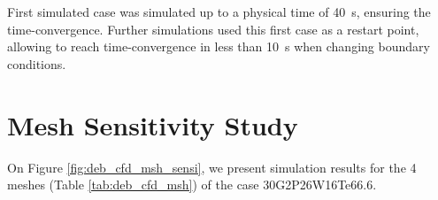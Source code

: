 \begin{note*}{}
First simulated case was simulated up to a physical time of 40\ s, ensuring the time-convergence. Further simulations used this first case as a restart point, allowing to reach time-convergence in less than 10\ s when changing boundary conditions.  
\end{note*}



\section{Mesh Sensitivity Study}

On Figure \ref{fig:deb_cfd_msh_sensi}, we present simulation results for the 4 meshes (Table \ref{tab:deb_cfd_msh}) of the case 30G2P26W16Te66.6. 

\begin{figure}[!h]
\centering
{}
\\
\end{figure}
